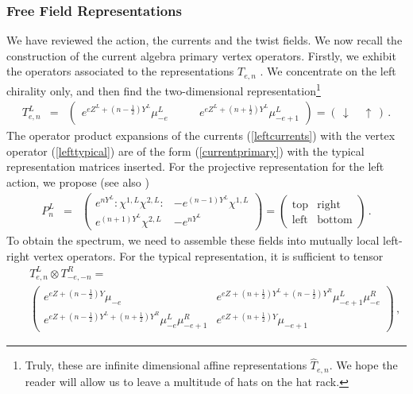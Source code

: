 \documentclass[12pt]{article}
\numberwithin{equation}{section}
\numberwithin{equation}{section}
\numberwithin{table}{section}\setlength{\multlinegap}{25pt}
\begin{document}
\subsubsection{Free Field Representations}
We have reviewed the action, the currents and the twist fields. We now recall the construction of the current algebra primary vertex operators.
Firstly, we exhibit the operators associated
to the representations $T_{e,n}$  \cite{Creutzig:2008an}.
We concentrate on the left chirality only, and then find the two-dimensional representation\footnote{Truly, these are infinite dimensional affine
representations $\hat{T}_{e,n}$. We hope the reader will allow  us to leave a multitude of hats on the hat rack.}
\begin{eqnarray}
T_{e,n}^L &=& \left( \begin{array}{cc}
e^{e Z^L + (n-\frac{1}{2}) Y^L} \mu^L_{-e}  &\qquad
 e^{e Z^L + (n+\frac{1}{2})Y^L} \mu^L_{-e+1} 
\end{array} \right) = \left( \, \downarrow \quad \uparrow \, \right) \, . \label{lefttypical}
\end{eqnarray}
The operator product expansions of the currents (\ref{leftcurrents}) with the vertex operator (\ref{lefttypical})
are of the form (\ref{currentprimary}) with the typical representation matrices inserted.
For the projective representation for the left action, we propose (see also \cite{LeClair:2007aj})
\begin{eqnarray}
P^L_{n} &=&  \left( \begin{array}{cc}
 e^{ n Y^L} :\chi^{1,L} \chi^{2,L}: &
- e^{ (n-1)Y^L}\chi^{1,L} \\
 e^{ (n+1) Y^L} \chi^{2,L} & 
- e^{ n Y^L}
\end{array} \right)=
 \left( \begin{array}{cc}
 \mbox{top} &
\mbox{right} \\
\mbox{left} & 
\mbox{bottom}
\end{array} \right)
 \, . \label{leftprojective}
\end{eqnarray}
To obtain the spectrum, we need to assemble these fields into mutually local left-right vertex operators.
For the typical representation, it is sufficient to tensor
\begin{eqnarray}
& & T^L_{e,n} \otimes T^R_{-e,-n} = \nonumber \\
& &   \left( \begin{array}{cc}
e^{e Z + (n-\frac{1}{2}) Y} \mu_{-e} & e^{e Z + (n+\frac{1}{2}) Y^L + (n-\frac{1}{2})Y^R} \mu_{-e+1}^L \mu_{-e}^R
 \\
 e^{e Z + (n-\frac{1}{2}) Y^L + (n+\frac{1}{2})Y^R} \mu_{-e}^L \mu_{-e+1}^R & e^{e Z + (n+\frac{1}{2}) Y} \mu_{-e+1}
\end{array} \right) \, ,
 \nonumber
\end{eqnarray}
\end{document}
